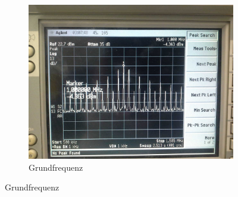 \FloatBarrier
\begin{figure}[!h]
	\begin{subfigure}[t]{1\textwidth}
		\centering
		\includegraphics[scale=0.17]{../Grafiken/Frequenzspektrum_d_FreqModuliert_0.jpg}
		\caption{Grundfrequenz\label{fig:frequenzspektrum_d_freqmoduliert_0}}
	\end{subfigure}%
	

\end{figure}
